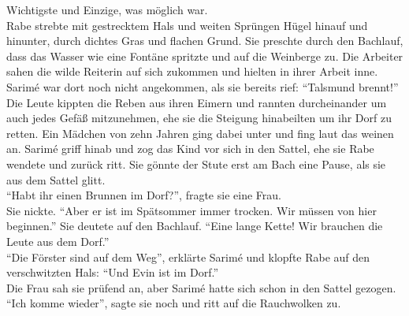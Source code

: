 Wichtigste und Einzige, was möglich war.\\
Rabe strebte mit gestrecktem Hals und weiten Sprüngen Hügel hinauf und hinunter, durch dichtes Gras 
und flachen Grund. Sie preschte durch den Bachlauf, dass das Wasser wie eine Fontäne spritzte und 
auf die Weinberge zu. Die Arbeiter sahen die wilde Reiterin auf sich zukommen und hielten in ihrer 
Arbeit inne.\\
Sarimé war dort noch nicht angekommen, als sie bereits rief: ``Talsmund brennt!''\\
Die Leute kippten die Reben aus ihren Eimern und rannten durcheinander um auch jedes Gefäß 
mitzunehmen, ehe sie die Steigung hinabeilten um ihr Dorf zu retten. Ein Mädchen von zehn Jahren 
ging dabei unter und fing laut das weinen an. Sarimé griff hinab und zog das Kind vor sich in den 
Sattel, ehe sie Rabe wendete und zurück ritt. Sie gönnte der Stute erst am Bach eine Pause, als sie 
aus dem Sattel glitt.\\
``Habt ihr einen Brunnen im Dorf?'', fragte sie eine Frau.\\
Sie nickte. ``Aber er ist im Spätsommer immer trocken. Wir müssen von hier beginnen.'' Sie deutete 
auf den Bachlauf. ``Eine lange Kette! Wir brauchen die Leute aus dem Dorf.''\\
``Die Förster sind auf dem Weg'', erklärte Sarimé und klopfte Rabe auf den verschwitzten Hals: 
``Und Evin ist im Dorf.''\\
Die Frau sah sie prüfend an, aber Sarimé hatte sich schon in den Sattel gezogen. ``Ich komme 
wieder'', sagte sie noch und ritt auf die Rauchwolken zu.\\

